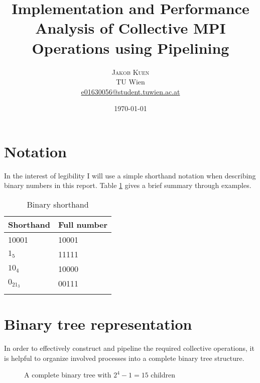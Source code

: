 \documentclass[twoside,twocolumn,hidelinks]{article}
\title{Implementation and Performance Analysis of Collective MPI Operations using Pipelining} %
\author{%
\textsc{Jakob Kuen} \\[1ex] %
\normalsize TU Wien \\ %
\normalsize \href{mailto:e01630056@student.tuwien.ac.at}{e01630056@student.tuwien.ac.at} %
}
\date{\today} %
\begin{document}
\nocite{*}

\maketitle


\section*{Notation}
In the interest of legibility I will use a simple shorthand notation when describing binary numbers in this report. Table \ref{tab:binary_shorthand} gives a brief summary through examples.

\begin{table}[h]
      \centering
      \begin{tabular}{ll}
            \toprule
            Shorthand & Full number \\
            \midrule
            10001    & 10001 \\
            $1_5$    & 11111  \\
            $10_4$   & 10000  \\
            $0_21_3$ & 00111  \\
            \bottomrule
            \label{tab:binary_shorthand}
      \end{tabular}
      \caption{Binary shorthand}
\end{table}

\section*{Binary tree representation}\label{sec:binary_tree}
In order to effectively construct and pipeline the required collective operations, it is helpful to organize involved processes into a complete binary tree structure. 

\begin{figure}
      \centering
      \caption{A complete binary tree with $2^4-1 = 15$ children}
      \label{fig:tree_inorder}
\end{figure}
\end{document}
